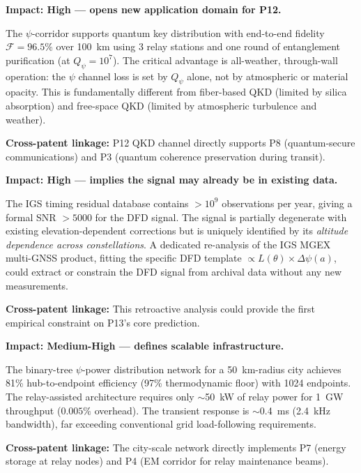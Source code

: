 \documentclass[aps,prd,twocolumn,superscriptaddress,nofootinbib]{revtex4-2}
\newcommand{\Qpsi}{Q_\psi}
\begin{document}
\begin{tcolorbox}[colback=green!5!white,colframe=green!75!black,title=
{Finding \#2: QKD via $\psi$-Corridor at 96.5\% Fidelity (100~km)}]
\textbf{Impact: High --- opens new application domain for P12.}

The $\psi$-corridor supports quantum key distribution with end-to-end
fidelity $\mathcal{F} = 96.5\%$ over 100~km using 3 relay stations
and one round of entanglement purification (at $\Qpsi = 10^7$).
The critical advantage is all-weather, through-wall operation: the
$\psi$ channel loss is set by $\Qpsi$ alone, not by atmospheric
or material opacity. This is fundamentally different from fiber-based
QKD (limited by silica absorption) and free-space QKD (limited by
atmospheric turbulence and weather).

\textbf{Cross-patent linkage:} P12 QKD channel directly supports
P8 (quantum-secure communications) and P3 (quantum coherence
preservation during transit).
\end{tcolorbox}

\begin{tcolorbox}[colback=yellow!5!white,colframe=orange!75!black,title=
{Finding \#3: Existing GPS Residuals Should Contain the DFD Signal}]
\textbf{Impact: High --- implies the signal may already be in existing data.}

The IGS timing residual database contains $>10^9$ observations per year,
giving a formal SNR $>5000$ for the DFD signal. The signal is partially
degenerate with existing elevation-dependent corrections but is uniquely
identified by its \emph{altitude dependence across constellations}. A
dedicated re-analysis of the IGS MGEX multi-GNSS product, fitting the
specific DFD template $\propto L(\theta)\times\Delta\psi(a)$, could
extract or constrain the DFD signal from archival data without any
new measurements.

\textbf{Cross-patent linkage:} This retroactive analysis could provide
the first empirical constraint on P13's core prediction.
\end{tcolorbox}

\begin{tcolorbox}[colback=red!5!white,colframe=red!75!black,title=
{Finding \#4: City-Scale $\psi$-Network at 81\% Efficiency}]
\textbf{Impact: Medium-High --- defines scalable infrastructure.}

The binary-tree $\psi$-power distribution network for a 50~km-radius
city achieves 81\% hub-to-endpoint efficiency (97\% thermodynamic
floor) with 1024 endpoints. The relay-assisted architecture requires
only $\sim$50~kW of relay power for 1~GW throughput ($0.005\%$ overhead).
The transient response is $\sim$0.4~ms (2.4~kHz bandwidth), far
exceeding conventional grid load-following requirements.

\textbf{Cross-patent linkage:} The city-scale network directly
implements P7 (energy storage at relay nodes) and P4 (EM corridor
for relay maintenance beams).
\end{tcolorbox}
\end{document}
